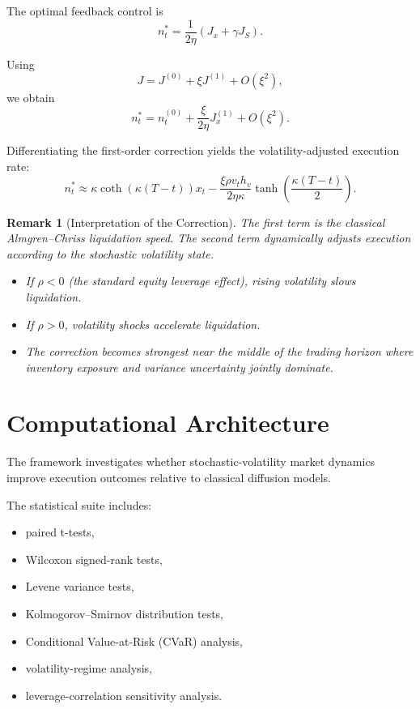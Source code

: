 \documentclass[11pt]{article}
\newtheorem{remark}[theorem]{Remark}
\begin{document}
The optimal feedback control is
\[
n_t^*
=
\frac{1}{2\eta}
\left(J_x+\gamma J_S\right).
\]

Using
\[
J
=
J^{(0)} + \xi J^{(1)} + O(\xi^2),
\]
we obtain
\[
 n_t^*
 =
 n_t^{(0)}
 +
 \frac{\xi}{2\eta}J_x^{(1)}
 +
 O(\xi^2).
\]

Differentiating the first-order correction yields the volatility-adjusted execution rate:
\[
\boxed{
 n_t^*
 \approx
 \kappa
 \coth(\kappa(T-t))x_t
 -
 \frac{\xi\rho v_th_v}{2\eta\kappa}
 \tanh\left(\frac{\kappa(T-t)}{2}\right)
 }.
\]

\begin{remark}[Interpretation of the Correction]
The first term is the classical Almgren--Chriss liquidation speed. The second term dynamically adjusts execution according to the stochastic volatility state.

\begin{itemize}
\item If $\rho<0$ (the standard equity leverage effect), rising volatility slows liquidation.
\item If $\rho>0$, volatility shocks accelerate liquidation.
\item The correction becomes strongest near the middle of the trading horizon where inventory exposure and variance uncertainty jointly dominate.
\end{itemize}
\end{remark}

\section{Computational Architecture}

The framework investigates whether stochastic-volatility market dynamics improve execution outcomes relative to classical diffusion models.

The statistical suite includes:
\begin{itemize}
\item paired t-tests,
\item Wilcoxon signed-rank tests,
\item Levene variance tests,
\item Kolmogorov--Smirnov distribution tests,
\item Conditional Value-at-Risk (CVaR) analysis,
\item volatility-regime analysis,
\item leverage-correlation sensitivity analysis.
\end{itemize}
\end{document}
